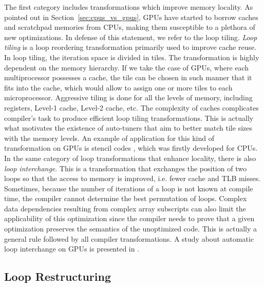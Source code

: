 The first category includes transformations which improve memory locality. As
pointed out in Section~\ref{sec:cpus_vs_gpus}, GPUs have started to borrow
caches and scratchpad memories from CPUs, making them susceptible to a plethora
of new optimizations. In defense of this statement, we refer to the loop tiling.
\textit{Loop tiling} is a loop reordering transformation primarily used to
improve cache reuse. In loop tiling, the iteration space is divided in tiles.
The transformation is highly dependent on the memory hierarchy. If we take the
case of GPUs, where each multiprocessor possesses a cache, the tile can be
chosen in such manner that it fits into the cache, which would allow to assign
one or more tiles to each microprocessor. Aggressive tiling is done for all the
levels of memory, including registers, Level-1 cache, Level-2 cache, etc. The
complexity of caches complicates compiler's task to produce efficient loop
tiling transformations. This is actually what motivates the existence of
auto-tuners that aim to better match tile sizes with the memory levels. An
example of application for this kind of transformation on GPUs is stencil codes
\cite{volkov2010}, which was firstly developed for CPUs. In the same category of
loop transformations that enhance locality, there is also \textit{loop
interchange}. This is a transformation that exchanges the position of two loops
so that the access to memory is improved, i.e. fewer cache and TLB misses.
Sometimes, because the number of iterations of a loop is not known at compile
time, the compiler cannot determine the best permutation of loops. Complex data
dependencies resulting from complex array subscripts can also limit the
applicability of this optimization since the compiler needs to prove that a
given optimization preserves the semantics of the unoptimized code. This is
actually a general rule followed by all compiler transformations. A study about
automatic loop interchange on GPUs is presented in
\cite{Leung:2009:APG:1596655.1596670}.

\subsection{Loop Restructuring}

